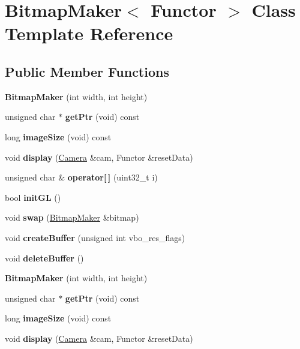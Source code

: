 \hypertarget{class_bitmap_maker}{}\section{Bitmap\+Maker$<$ Functor $>$ Class Template Reference}
\label{class_bitmap_maker}
\subsection*{Public Member Functions}
\begin{DoxyCompactItemize}
\item 
{\bfseries Bitmap\+Maker} (int width, int height)
\item 
unsigned char $\ast$ {\bfseries get\+Ptr} (void) const
\item 
long {\bfseries image\+Size} (void) const
\item 
void {\bfseries display} (\hyperlink{struct_camera}{Camera} \&cam, Functor \&reset\+Data)\hypertarget{class_bitmap_maker_a233746936bb4d610ac0ad87094a07caf}{}\label{class_bitmap_maker_a233746936bb4d610ac0ad87094a07caf}

\item 
unsigned char \& {\bfseries operator\mbox{[}$\,$\mbox{]}} (uint32\+\_\+t i)
\item 
bool {\bfseries init\+GL} ()
\item 
void {\bfseries swap} (\hyperlink{class_bitmap_maker}{Bitmap\+Maker} \&bitmap)
\item 
void {\bfseries create\+Buffer} (unsigned int vbo\+\_\+res\+\_\+flags)
\item 
void {\bfseries delete\+Buffer} ()
\item 
{\bfseries Bitmap\+Maker} (int width, int height)\hypertarget{class_bitmap_maker_a17442bb06bac6120078e6ca3515c309f}{}\label{class_bitmap_maker_a17442bb06bac6120078e6ca3515c309f}

\item 
unsigned char $\ast$ {\bfseries get\+Ptr} (void) const\hypertarget{class_bitmap_maker_a97a10d0f05fb7951065d42a51aac5f78}{}\label{class_bitmap_maker_a97a10d0f05fb7951065d42a51aac5f78}

\item 
long {\bfseries image\+Size} (void) const\hypertarget{class_bitmap_maker_ad1a201460b2575a507334385e21ac902}{}\label{class_bitmap_maker_ad1a201460b2575a507334385e21ac902}

\item 
void {\bfseries display} (\hyperlink{struct_camera}{Camera} \&cam, Functor \&reset\+Data)\hypertarget{class_bitmap_maker_a233746936bb4d610ac0ad87094a07caf}{}\label{class_bitmap_maker_a233746936bb4d610ac0ad87094a07caf}


\end{DoxyCompactItemize}
